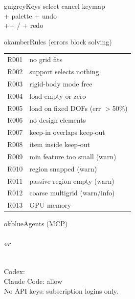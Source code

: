 {\begin{minipage}[t]{0.485\linewidth}
\begin{qrbox}{guigrey}{Keys}
 select \enspace {} cancel \enspace {} keymap\\[2pt]
+ palette \enspace {}+ undo\\[2pt]
++ / + redo
\end{qrbox}
\end{minipage}\hfill
\begin{minipage}[t]{0.485\linewidth}\vspace{0pt}
\begin{qrbox}{okamber}{Rules (errors block solving)}
\renewcommand{\arraystretch}{1.05}
\begin{tabular}{@{}l@{\enspace}l@{}}
R001 & no grid fits \\
R002 & support selects nothing \\
R003 & rigid-body mode free \\
R004 & load empty or zero \\
R005 & load on fixed DOFs (err $>$50\%) \\
R006 & no design elements \\
R007 & keep-in overlaps keep-out \\
R008 & item inside keep-out \\
R009 & min feature too small (warn) \\
R010 & region snapped (warn) \\
R011 & passive region empty (warn) \\
R012 & coarse multigrid (warn/info) \\
R013 & GPU memory \\
\end{tabular}
\end{qrbox}

\begin{qrbox}{okblue}{Agents (MCP)}
\\
\quad{}\\
\quad\emph{or} \\
\quad{}\\
\quad{}\\[2pt]
Codex: \\
Claude Code: allow \\
No API keys: subscription logins only.
\end{qrbox}


\end{minipage}}
